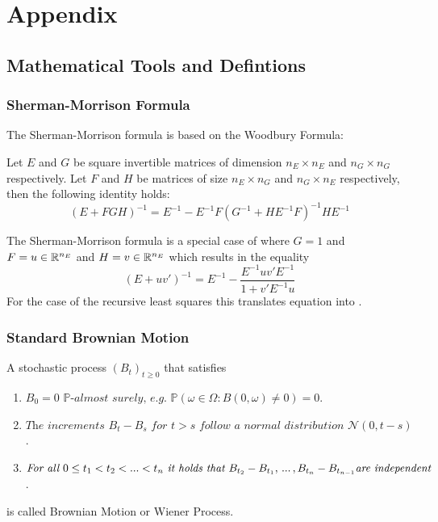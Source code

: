 \appendix
{} %
\section{Appendix}

\subsection{Mathematical Tools and Defintions}

\subsubsection{Sherman-Morrison Formula}
\label{CH:Appendix:Math:MatrixInversion}

The Sherman-Morrison formula is based on the Woodbury Formula:

\begin{lemma}
    Let $E$ and $G$ be square invertible matrices of dimension $n_E \times n_E$ and $n_G \times n_G$ respectively. Let $F$ and $H$ be matrices of size $n_E \times n_G$ and $n_G \times n_E$ respectively, then the following identity holds:
    \begin{equation}
        (E + FGH)^{-1} = E^{-1} - E^{-1} F(G^{-1} + HE^{-1}F)^{-1}HE^{-1} \label{EQ:Woodbury}
    \end{equation}
\end{lemma}

The Sherman-Morrison formula is a special case of  where $G = 1$ and $F=u \in \mathbb{R}^{n_E}$ and $H=v \in \mathbb{R}^{n_E}$ which results in the equality
\begin{equation}
    (E+uv')^{-1} = E^{-1} - \frac{E^{-1}uv'E^{-1}}{1 + v'E^{-1}u}
\end{equation}
For the case of the recursive least squares this translates equation  into .

\subsubsection{Standard Brownian Motion}

A stochastic process $\left(B_t\right)_{t\geq0}$ that satisfies
\begin{enumerate}
    \item $B_0 = 0 \,\,\mathbb{P}\textit{-almost surely, e.g. } \mathbb{P}\left(\omega \in \Omega : B\left(0,\omega\right) \neq 0 \right) = 0 $.
    \item $\textit{The increments } B_t - B_s \textit{ for } t>s \textit{ follow a normal distribution } \mathcal{N}(0,t-s)$.
    \item $\textit{For all } 0\leq t_1 < t_2 < ... < t_n \textit{ it holds that } B_{t_2} - B_{t_1}, \, ... \, ,B_{t_n}-B_{t_{n-1}} \\ \textit{are independent}$.
\end{enumerate}
is called Brownian Motion or Wiener Process.

